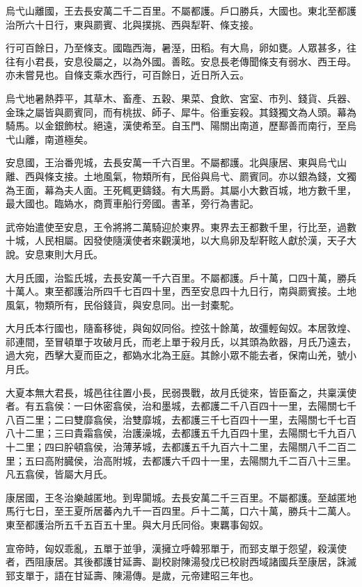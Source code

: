 \begin{pinyinscope}
烏弋山離國，王去長安萬二千二百里。不屬都護。戶口勝兵，大國也。東北至都護治所六十日行，東與罽賓、北與撲挑、西與犁靬、條支接。

行可百餘日，乃至條支。國臨西海，暑溼，田稻。有大鳥，卵如甕。人眾甚多，往往有小君長，安息役屬之，以為外國。善眩。安息長老傳聞條支有弱水、西王母。亦未嘗見也。自條支乘水西行，可百餘日，近日所入云。

烏弋地暑熱莽平，其草木、畜產、五穀、果菜、食飲、宮室、市列、錢貨、兵器、金珠之屬皆與罽賓同，而有桃拔、師子、犀牛。俗重妄殺。其錢獨文為人頭。幕為騎馬。以金銀飾杖。絕遠，漢使希至。自玉門、陽關出南道，歷鄯善而南行，至烏弋山離，南道極矣。

安息國，王治番兜城，去長安萬一千六百里。不屬都護。北與康居、東與烏弋山離、西與條支接。土地風氣，物類所有，民俗與烏弋、罽賓同。亦以銀為錢，文獨為王面，幕為夫人面。王死輒更鑄錢。有大馬爵。其屬小大數百城，地方數千里，最大國也。臨媯水，商賈車船行旁國。書革，旁行為書記。

武帝始遣使至安息，王令將將二萬騎迎於東界。東界去王都數千里，行比至，過數十城，人民相屬。因發使隨漢使者來觀漢地，以大鳥卵及犁靬眩人獻於漢，天子大說。安息東則大月氏。

大月氏國，治監氏城，去長安萬一千六百里。不屬都護。戶十萬，口四十萬，勝兵十萬人。東至都護治所四千七百四十里，西至安息四十九日行，南與罽賓接。土地風氣，物類所有，民俗錢貨，與安息同。出一封橐駝。

大月氏本行國也，隨畜移徙，與匈奴同俗。控弦十餘萬，故彊輕匈奴。本居敦煌、祁連間，至冒頓單于攻破月氏，而老上單于殺月氏，以其頭為飲器，月氏乃遠去，過大宛，西擊大夏而臣之，都媯水北為王庭。其餘小眾不能去者，保南山羌，號小月氏。

大夏本無大君長，城邑往往置小長，民弱畏戰，故月氏徙來，皆臣畜之，共稟漢使者。有五翕侯：一曰休密翕侯，治和墨城，去都護二千八百四十一里，去陽關七千八百二里；二曰雙靡翕侯，治雙靡城，去都護三千七百四十一里，去陽關七千七百八十二里；三曰貴霜翕侯，治護澡城，去都護五千九百四十里，去陽關七千九百八十二里；四曰肸頓翕侯，治薄茅城，去都護五千九百六十二里，去陽關八千二百二里；五曰高附臓侯，治高附城，去都護六千四十一里，去陽關九千二百八十三里。凡五翕侯，皆屬大月氏。

康居國，王冬治樂越匿地。到卑闐城。去長安萬二千三百里。不屬都護。至越匿地馬行七日，至王夏所居蕃內九千一百四里。戶十二萬，口六十萬，勝兵十二萬人。東至都護治所五千五百五十里。與大月氏同俗。東羈事匈奴。

宣帝時，匈奴乖亂，五單于並爭，漢擁立呼韓邪單于，而郅支單于怨望，殺漢使者，西阻康居。其後都護甘延壽、副校尉陳湯發戊已校尉西域諸國兵至康居，誅滅郅支單于，語在甘延壽、陳湯傳。是歲，元帝建昭三年也。


\end{pinyinscope}
